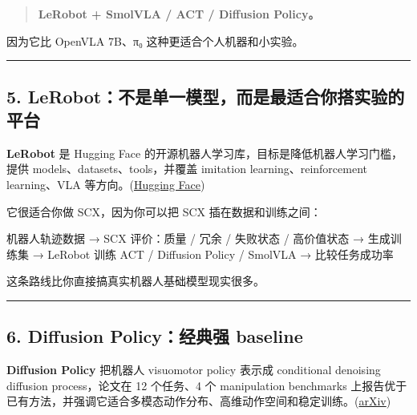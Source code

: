 \documentclass[
  12pt,
]{ctexart}
\newenvironment{Shaded}{}{}
\newcommand{\NormalTok}[1]{#1}
\begin{document}
\begin{quote}
\textbf{LeRobot + SmolVLA / ACT / Diffusion Policy。}
\end{quote}

因为它比 OpenVLA 7B、π₀ 这种更适合个人机器和小实验。

\begin{center}\rule{0.5\linewidth}{0.5pt}\end{center}

\subsection{5.
LeRobot：不是单一模型，而是最适合你搭实验的平台}\label{lerobotux4e0dux662fux5355ux4e00ux6a21ux578bux800cux662fux6700ux9002ux5408ux4f60ux642dux5b9eux9a8cux7684ux5e73ux53f0}

\textbf{LeRobot} 是 Hugging Face
的开源机器人学习库，目标是降低机器人学习门槛，提供
models、datasets、tools，并覆盖 imitation learning、reinforcement
learning、VLA
等方向。(\href{https://www.mvtec.com/research-teaching/datasets/mvtec-ad?utm_source=chatgpt.com}{Hugging
Face})

它很适合你做 SCX，因为你可以把 SCX 插在数据和训练之间：

\begin{Shaded}
\begin{Highlighting}[]
\NormalTok{机器人轨迹数据}
\NormalTok{→ SCX 评价：质量 / 冗余 / 失败状态 / 高价值状态}
\NormalTok{→ 生成训练集}
\NormalTok{→ LeRobot 训练 ACT / Diffusion Policy / SmolVLA}
\NormalTok{→ 比较任务成功率}
\end{Highlighting}
\end{Shaded}

这条路线比你直接搞真实机器人基础模型现实很多。

\begin{center}\rule{0.5\linewidth}{0.5pt}\end{center}

\subsection{6. Diffusion Policy：经典强
baseline}\label{diffusion-policyux7ecfux5178ux5f3a-baseline}

\textbf{Diffusion Policy} 把机器人 visuomotor policy 表示成 conditional
denoising diffusion process，论文在 12 个任务、4 个 manipulation
benchmarks
上报告优于已有方法，并强调它适合多模态动作分布、高维动作空间和稳定训练。(\href{https://circuitnet.github.io/?utm_source=chatgpt.com}{arXiv})
\end{document}
